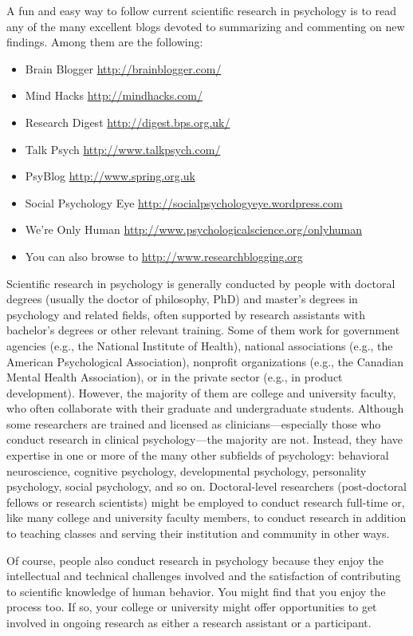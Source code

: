 A fun and easy way to follow current scientific research in psychology is to read any of the many excellent blogs devoted to summarizing and commenting on new findings. Among them are the following:
\begin{itemize}
\item Brain Blogger \url{http://brainblogger.com/}
\item Mind Hacks \url{http://mindhacks.com/}
\item Research Digest \url{http://digest.bps.org.uk/}
\item Talk Psych \url{http://www.talkpsych.com/}
\item PsyBlog \url{http://www.spring.org.uk}
\item Social Psychology Eye \url{http://socialpsychologyeye.wordpress.com}
\item We're Only Human \url{http://www.psychologicalscience.org/onlyhuman}
\item You can also browse to \url{http://www.researchblogging.org}
\end{itemize}


Scientific research in psychology is generally conducted by people with doctoral degrees (usually the doctor of philosophy, PhD) and master's degrees in psychology and related fields, often supported by research assistants with bachelor's degrees or other relevant training. Some of them work for government agencies (e.g., the National Institute of Health), national associations (e.g., the American Psychological Association), nonprofit organizations (e.g., the Canadian Mental Health Association), or in the private sector (e.g., in product development). However, the majority of them are college and university faculty, who often collaborate with their graduate and undergraduate students. Although some researchers are trained and licensed as clinicians---especially those who conduct research in clinical psychology---the majority are not. Instead, they have expertise in one or more of the many other subfields of psychology: behavioral neuroscience, cognitive psychology, developmental psychology, personality psychology, social psychology, and so on. Doctoral-level researchers (post-doctoral fellows or research scientists) might be employed to conduct research full-time or, like many college and university faculty members, to conduct research in addition to teaching classes and serving their institution and community in other ways.

Of course, people also conduct research in psychology because they enjoy the intellectual and technical challenges involved and the satisfaction of contributing to scientific knowledge of human behavior. You might find that you enjoy the process too. If so, your college or university might offer opportunities to get involved in ongoing research as either a research assistant or a participant.

